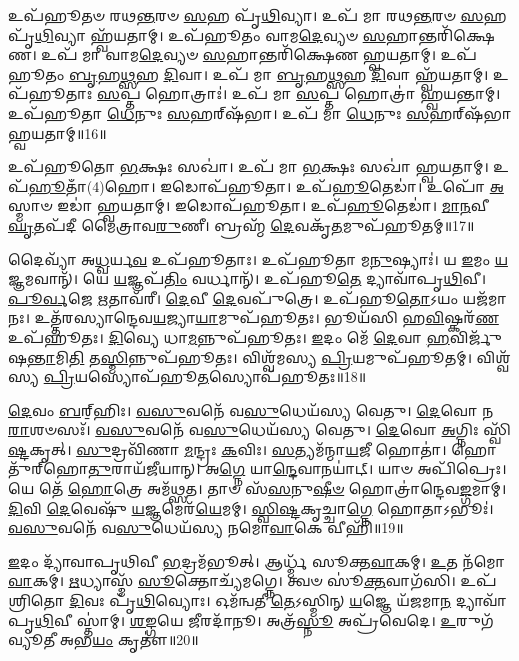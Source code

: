 𑌉𑌪᳴𑌹𑍂𑌤𑍞 𑌰𑌥\-\ul{𑌨𑍍𑌤}\-𑌰𑍞 \ul{𑌸}\-𑌹 𑌪𑍃᳴\-\ul{𑌥𑌿}\-𑌵𑍍𑌯𑌾।
𑌉𑌪᳴ 𑌮𑌾 𑌰𑌥\-\ul{𑌨𑍍𑌤}\-𑌰𑍞 \ul{𑌸}\-𑌹 𑌪𑍃᳴\-\ul{𑌥𑌿}\-𑌵𑍍𑌯𑌾 𑌹𑍍𑌵᳴𑌯𑌤𑌾𑌮𑍍।
𑌉𑌪᳴𑌹𑍂𑌤𑌂 𑌵𑌾𑌮\-\ul{𑌦𑍇}\-𑌵𑍍𑌯𑍞 \ul{𑌸}\-𑌹𑌾𑌨𑍍𑌤𑌰𑌿᳴𑌕𑍍𑌷𑍇𑌣।
𑌉𑌪᳴ 𑌮𑌾 𑌵𑌾𑌮\-\ul{𑌦𑍇}\-𑌵𑍍𑌯𑍞 \ul{𑌸}\-𑌹𑌾𑌨𑍍𑌤𑌰𑌿᳴𑌕𑍍𑌷𑍇𑌣 𑌹𑍍𑌵𑌯𑌤𑌾𑌮𑍍।
𑌉𑌪᳴𑌹𑍂𑌤𑌂 \ul{𑌬𑍃}\-𑌹\-\ul{𑌥𑍍𑌸}\-𑌹 \ul{𑌦𑌿}\-𑌵𑌾।
𑌉𑌪᳴ 𑌮𑌾 \ul{𑌬𑍃}\-𑌹\-\ul{𑌥𑍍𑌸}\-𑌹 \ul{𑌦𑌿}\-𑌵𑌾 𑌹𑍍𑌵᳴𑌯𑌤𑌾𑌮𑍍।
𑌉𑌪᳴𑌹𑍂𑌤𑌾𑌃 \ul{𑌸}\-𑌪𑍍𑌤 𑌹𑍋𑌤𑍍𑌰𑌾𑌃॑।
𑌉𑌪᳴ 𑌮𑌾 \ul{𑌸}\-𑌪𑍍𑌤 𑌹𑍋𑌤𑍍𑌰𑌾॑ 𑌹𑍍𑌵𑌯𑌨𑍍𑌤𑌾𑌮𑍍।
𑌉𑌪᳴𑌹𑍂𑌤𑌾 \ul{𑌧𑍇}\-𑌨𑍁𑌃 \ul{𑌸}\-𑌹𑌰𑍍‌\mbox{}𑌷᳴𑌭𑌾।
𑌉𑌪᳴ 𑌮𑌾 \ul{𑌧𑍇}\-𑌨𑍁𑌃 \ul{𑌸}\-𑌹𑌰𑍍‌\mbox{}𑌷᳴𑌭𑌾 𑌹𑍍𑌵𑌯𑌤𑌾𑌮𑍍॥16॥

𑌉𑌪᳴𑌹𑍂𑌤𑍋 \ul{𑌭}\-𑌕𑍍𑌷𑌃 𑌸𑌖𑌾॑।
𑌉𑌪᳴ 𑌮𑌾 \ul{𑌭}\-𑌕𑍍𑌷𑌃 𑌸𑌖𑌾॑ 𑌹𑍍𑌵𑌯𑌤𑌾𑌮𑍍।
𑌉𑌪᳴\-\ul{𑌹𑍂}\-𑌤𑌾𑌁(4)𑌹𑍋।
𑌇𑌡𑍋𑌪᳴𑌹𑍂𑌤𑌾।
𑌉𑌪᳴\-\ul{𑌹𑍂}\-𑌤𑍇𑌡𑌾॑।
𑌉𑌪𑍋᳴ \ul{𑌅}\-𑌸𑍍𑌮𑌾𑍞 𑌇𑌡𑌾॑ 𑌹𑍍𑌵𑌯𑌤𑌾𑌮𑍍।
𑌇𑌡𑍋𑌪᳴𑌹𑍂𑌤𑌾।
𑌉𑌪᳴\-\ul{𑌹𑍂}\-𑌤𑍇𑌡𑌾॑।
\-\ul{𑌮𑌾}\-\-\ul{𑌨}\-𑌵𑍀 \ul{𑌘𑍃}\-𑌤𑌪᳴𑌦𑍀 𑌮𑍈𑌤𑍍𑌰𑌾𑌵\-\ul{𑌰𑍁}\-𑌣𑍀।
𑌬𑍍𑌰𑌹𑍍𑌮᳴ \ul{𑌦𑍇}\-𑌵𑌕𑍃᳴\-\ul{𑌤}\-𑌮𑍁𑌪᳴𑌹𑍂𑌤𑌮𑍍॥17॥

𑌦𑍈𑌵𑍍𑌯𑌾᳴ 𑌅\-\ul{𑌧𑍍𑌵}\-𑌰𑍍𑌯\-\ul{𑌵} 𑌉𑌪᳴𑌹𑍂𑌤𑌾𑌃।
𑌉𑌪᳴𑌹𑍂𑌤𑌾 𑌮\-\ul{𑌨𑍁}\-𑌷𑍍𑌯𑌾𑌃॑।
𑌯 \ul{𑌇}\-𑌮𑌂 \ul{𑌯}\-𑌜𑍍𑌞𑌮𑌵𑌾𑌨𑍍᳴।
𑌯𑍇 \ul{𑌯}\-𑌜𑍍𑌞𑌪᳴\-\ul{𑌤𑌿𑌂} 𑌵𑌰𑍍𑌧𑌾𑌨𑍍᳴।
𑌉𑌪᳴𑌹𑍂\-\ul{𑌤𑍇} 𑌦𑍍𑌯𑌾𑌵𑌾᳴𑌪𑍃\-\ul{𑌥𑌿}\-𑌵𑍀।
\-\ul{𑌪𑍂}\-\-\ul{𑌰𑍍𑌵}\-𑌜𑍇 \ul{𑌋}\-𑌤𑌾𑌵᳴𑌰𑍀।
\-\ul{𑌦𑍇}\-𑌵𑍀 \ul{𑌦𑍇}\-𑌵𑌪𑍁᳴𑌤𑍍𑌰𑍇।
𑌉𑌪᳴𑌹𑍂\-\ul{𑌤𑍋}\-𑌽𑌯𑌂 𑌯𑌜᳴𑌮𑌾𑌨𑌃।
𑌉𑌤𑍍𑌤᳴𑌰𑌸𑍍𑌯𑌾𑌨𑍍𑌦𑍇𑌵\-\ul{𑌯}\-𑌜𑍍𑌯𑌾\-\ul{𑌯𑌾}\-𑌮𑍁𑌪᳴𑌹𑍂𑌤𑌃।
𑌭𑍂𑌯᳴𑌸𑌿 𑌹\-\ul{𑌵𑌿}\-𑌷𑍍𑌕𑌰᳴\-\ul{𑌣} 𑌉𑌪᳴𑌹𑍂𑌤𑌃।
\-\ul{𑌦𑌿}\-𑌵𑍍𑌯𑍇 𑌧𑌾\-\ul{𑌮}\-𑌨𑍍𑌨𑍁𑌪᳴𑌹𑍂𑌤𑌃।
\-\ul{𑌇}\-𑌦𑌂 𑌮𑍇᳴ \ul{𑌦𑍇}\-𑌵𑌾 \ul{𑌹}\-𑌵𑌿𑌰𑍍𑌜𑍁᳴𑌷\-\ul{𑌨𑍍𑌤𑌾}\-𑌮𑌿\-\ul{𑌤𑌿} 𑌤\-\ul{𑌸𑍍𑌮𑌿}\-𑌨𑍍𑌨𑍁𑌪᳴𑌹𑍂𑌤𑌃।
𑌵𑌿𑌶𑍍𑌵᳴𑌮𑌸𑍍𑌯 \ul{𑌪𑍍𑌰𑌿}\-𑌯𑌮𑍁𑌪᳴𑌹𑍂𑌤𑌮𑍍।
𑌵𑌿𑌶𑍍𑌵᳴𑌸𑍍𑌯 \ul{𑌪𑍍𑌰𑌿}\-𑌯𑌸𑍍𑌯𑍋𑌪᳴𑌹𑍂\-\ul{𑌤}\-𑌸𑍍𑌯𑍋𑌪᳴𑌹𑍂𑌤𑌃॥18॥\anuvakamend[\-\ul{𑌸}\-𑌹𑌰𑍍‌\mbox{}𑌷᳴𑌭𑌾 𑌹𑍍𑌵𑌯\-\ul{𑌤𑌾}\-𑌮𑍁𑌪᳴𑌹𑍂𑌤𑍞 𑌹\-\ul{𑌵𑌿}\-𑌷𑍍𑌕𑌰᳴\-\ul{𑌣} 𑌉𑌪᳴𑌹𑍂𑌤\-\ul{𑌶𑍍𑌚}\-𑌤𑍍𑌵𑌾𑌰𑌿᳴ 𑌚]

\-\ul{𑌦𑍇}\-𑌵𑌂 \ul{𑌬}\-𑌰𑍍‌॒\mbox{}𑌹𑌿𑌃।
\-\ul{𑌵}\-\-\ul{𑌸𑍁}\-𑌵𑌨𑍇᳴ 𑌵\-\ul{𑌸𑍁}\-𑌧𑍇𑌯᳴𑌸𑍍𑌯 𑌵𑍇𑌤𑍁।
\-\ul{𑌦𑍇}\-𑌵𑍋 𑌨\-\ul{𑌰𑌾}\-𑌶𑍞𑌸𑌃᳴।
\-\ul{𑌵}\-\-\ul{𑌸𑍁}\-𑌵𑌨𑍇᳴ 𑌵\-\ul{𑌸𑍁}\-𑌧𑍇𑌯᳴𑌸𑍍𑌯 𑌵𑍇𑌤𑍁।
\-\ul{𑌦𑍇}\-𑌵𑍋 \ul{𑌅}\-𑌗𑍍𑌨𑌿𑌃 𑌸𑍍𑌵𑌿᳴\-\ul{𑌷𑍍𑌟}\-𑌕𑍃𑌤𑍍।
\-\ul{𑌸𑍁}\-𑌦𑍍𑌰𑌵𑌿᳴𑌣𑌾 \ul{𑌮}\-𑌨𑍍𑌦𑍍𑌰𑌃 \ul{𑌕}\-𑌵𑌿𑌃।
\-\ul{𑌸}\-𑌤𑍍𑌯𑌮᳴𑌨𑍍𑌮𑌾\-\ul{𑌯}\-𑌜𑍀 𑌹𑍋𑌤𑌾॑।
𑌹𑍋𑌤𑍁᳴𑌰𑍍‌\mbox{}𑌹𑍋\-\ul{𑌤𑍁}\-𑌰𑌾𑌯᳴𑌜𑍀𑌯𑌾𑌨𑍍।
𑌅\-\ul{𑌗𑍍𑌨𑍇} 𑌯𑌾\-\ul{𑌨𑍍𑌦𑍇}\-𑌵𑌾𑌨𑌯𑌾॑𑌟𑍍।
𑌯𑌾𑍞 𑌅𑌪𑌿᳴𑌪𑍍𑌰𑍇𑌃।
𑌯𑍇 𑌤𑍇᳴ \ul{𑌹𑍋}\-𑌤𑍍𑌰𑍇 𑌅𑌮᳴𑌥𑍍𑌸𑌤।
𑌤𑌾𑍞 𑌸᳴\-\ul{𑌸}\-𑌨𑍁\-\ul{𑌷𑍀}\-\-\ul{𑍞} 𑌹𑍋𑌤𑍍𑌰𑌾॑𑌨𑍍𑌦𑍇𑌵\-\ul{𑌙𑍍𑌗}\-𑌮𑌾𑌮𑍍।
\-\ul{𑌦𑌿}\-𑌵𑌿 \ul{𑌦𑍇}\-𑌵𑍇𑌷𑍁᳴ \ul{𑌯}\-𑌜𑍍𑌞𑌮𑍇𑌰᳴\-\ul{𑌯𑍇}\-𑌮𑌮𑍍।
\-\ul{𑌸𑍍𑌵𑌿}\-\-\ul{𑌷𑍍𑌟}\-𑌕𑍃𑌚𑍍𑌚𑌾\-\ul{𑌗𑍍𑌨𑍇} 𑌹𑍋𑌤𑌾\-𑌽𑌭𑍂𑌃॑।
\-\ul{𑌵}\-\-\ul{𑌸𑍁}\-𑌵𑌨𑍇᳴ 𑌵\-\ul{𑌸𑍁}\-𑌧𑍇𑌯᳴𑌸𑍍𑌯 𑌨𑌮𑍋\-\ul{𑌵𑌾}\-𑌕𑍇 𑌵𑍀𑌹𑌿᳴॥19॥\anuvakamend[𑌅𑌪𑌿᳴\-\ul{𑌪𑍍𑌰𑍇𑌃} 𑌪𑌞𑍍𑌚᳴ 𑌚]

\-\ul{𑌇}\-𑌦𑌂 𑌦𑍍𑌯𑌾᳴𑌵𑌾𑌪𑍃𑌥𑌿𑌵𑍀 \ul{𑌭}\-𑌦𑍍𑌰𑌮᳴𑌭𑍂𑌤𑍍।
𑌆𑌰𑍍𑌧𑍍𑌮᳴ 𑌸𑍂𑌕𑍍𑌤\-\ul{𑌵𑌾}\-𑌕𑌮𑍍।
\-\ul{𑌉}\-𑌤 𑌨᳴𑌮𑍋\-\ul{𑌵𑌾}\-𑌕𑌮𑍍।
\-\ul{𑌋}\-𑌧𑍍𑌯𑌾𑌸𑍍𑌮᳴ \ul{𑌸𑍂}\-𑌕𑍍𑌤𑍋𑌚𑍍𑌯᳴𑌮𑌗𑍍𑌨𑍇।
𑌤𑍍𑌵𑍞 𑌸𑍂॑\-\ul{𑌕𑍍𑌤}\-𑌵𑌾𑌗᳴𑌸𑌿।
𑌉𑌪᳴𑌶𑍍𑌰𑌿𑌤𑍋 \ul{𑌦𑌿}\-𑌵𑌃 𑌪𑍃᳴\-\ul{𑌥𑌿}\-𑌵𑍍𑌯𑍋𑌃।
𑌓𑌮᳴𑌨𑍍𑌵𑌤𑍀 \ul{𑌤𑍇}\-\-𑌽𑌸𑍍𑌮𑌿𑌨𑍍 \ul{𑌯}\-𑌜𑍍𑌞𑍇 𑌯᳴𑌜𑌮𑌾\-\ul{𑌨} 𑌦𑍍𑌯𑌾𑌵𑌾᳴𑌪𑍃\-\ul{𑌥𑌿}\-𑌵𑍀 𑌸𑍍𑌤𑌾॑𑌮𑍍।
\-\ul{𑌶}\-\-\ul{𑌙𑍍𑌗}\-𑌯𑍇 \ul{𑌜𑍀}\-𑌰𑌦𑌾᳴𑌨𑍂।
𑌅𑌤𑍍𑌰᳴\-\ul{𑌸𑍍𑌨𑍂} 𑌅𑌪𑍍𑌰᳴𑌵𑍇𑌦𑍇।
\-\ul{𑌉}\-𑌰𑍁𑌗᳴𑌵𑍍𑌯𑍂𑌤𑍀 𑌅𑌭\-\ul{𑌯𑌂} 𑌕𑍃𑌤𑍗॑॥20॥

